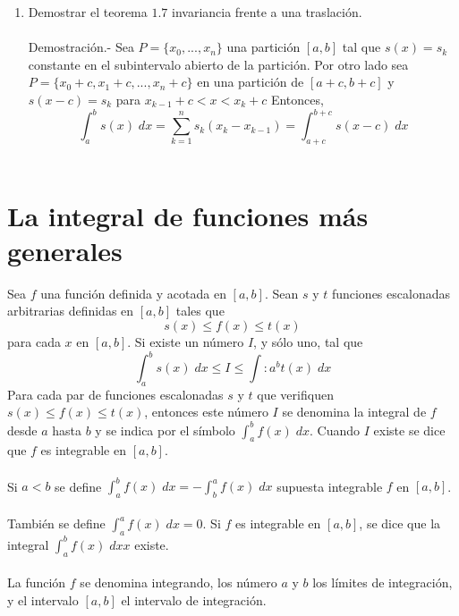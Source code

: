 \begin{enumerate}[ \bfseries 1.]
    \item Demostrar el teorema $1.7$ invariancia frente a una traslación.\\\\
	Demostración.-\;  Sea $P=\lbrace x_0,...,x_n \rbrace$ una partición $[a,b]$ tal que $s(x)=s_k$ constante en el subintervalo abierto de la partición. Por otro lado sea $P=\lbrace x_0+c,x_1+c,...,x_n+c \rbrace$ en una partición de $[a+c,b+c]$ y $s(x-c)=s_k$ para $x_{k-1}+c<x<x_k+c$ Entonces,
	$$\displaystyle\int_a^b s(x) \; dx = \sum\limits_{k=1}^n s_k(x_k-x_{k-1}) = \int_{a+c}^{b+c} s(x-c)\; dx $$\\

\end{enumerate}

\section{La integral de funciones más generales}

\begin{tcolorbox}
    \begin{def.} Sea $f$ una función definida y acotada en $[a,b]$. Sean $s$ y $t$ funciones escalonadas arbitrarias definidas en $[a,b]$ tales que $$s(x)\leq f(x) \leq t(x)$$
	para cada $x$ en $[a,b]$. Si existe un número $I$, y sólo uno, tal que $$\displaystyle\int_a^b s(x)\; dx \leq I \leq \int:a^b t(x) \; dx$$
	Para cada par de funciones escalonadas $s$ y $t$ que verifiquen $s(x) \leq f(x) \leq t(x)$, entonces este número $I$ se denomina la integral de $f$ desde $a$ hasta $b$ y se indica por el símbolo $\displaystyle\int_a^b f(x) \; dx$. Cuando $I$ existe se dice que $f$ es integrable en $[a,b]$.\\\\
	Si $a<b$ se define $\displaystyle\int_a^b f(x) \; dx = - \int_b^a f(x) \; dx$ supuesta integrable $f$ en $[a,b]$.\\\\
	También se define $\displaystyle\int_a^a f(x) \; dx=0$. Si $f$ es integrable en $[a,b]$, se dice que la integral $\displaystyle\int_a^b f(x) \; dx x$ existe.\\\\
	La función $f$ se denomina integrando, los número $a$ y $b$ los límites de integración, y el intervalo $[a,b]$ el intervalo de integración.
    \end{def.}
\end{tcolorbox}

